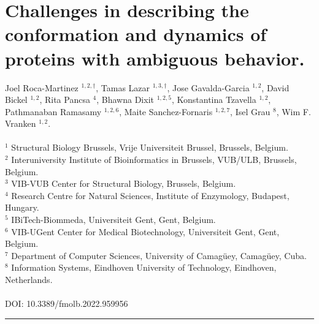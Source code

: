 \chapter{Challenges in describing the conformation and dynamics of proteins with ambiguous behavior.} \label{chapter:ambiguous}

Joel Roca-Martinez $^{1,2,\dag}$, Tamas Lazar $^{1,3,\dag}$, Jose Gavalda-Garcia $^{1,2}$, David Bickel $^{1,2}$, Rita Pancsa $^{4}$, Bhawna Dixit $^{1,2,5}$, Konstantina Tzavella $^{1,2}$, Pathmanaban Ramasamy $^{1,2,6}$, Maite Sanchez-Fornaris $^{1,2,7}$, Isel Grau $^{8}$, Wim F. Vranken $^{1,2}$.
\\
\\
$^{1}$ Structural Biology Brussels, Vrije Universiteit Brussel, Brussels, Belgium.
\\
$^{2}$ Interuniversity Institute of Bioinformatics in Brussels, VUB/ULB, Brussels, Belgium.
\\
$^{3}$ VIB-VUB Center for Structural Biology, Brussels, Belgium.
\\
$^{4}$ Research Centre for Natural Sciences, Institute of Enzymology, Budapest, Hungary.
\\
$^{5}$ IBiTech-Biommeda, Universiteit Gent, Gent, Belgium.
\\
$^{6}$ VIB-UGent Center for Medical Biotechnology, Universiteit Gent, Gent, \\Belgium.
\\
$^{7}$ Department of Computer Sciences, University of Camagüey, Camagüey, Cuba.
\\
$^{8}$ Information Systems, Eindhoven University of Technology, Eindhoven, \\Netherlands.
\\
\\
DOI: 10.3389/fmolb.2022.959956

\vspace{1em}
\hrule
\vspace{1em}

